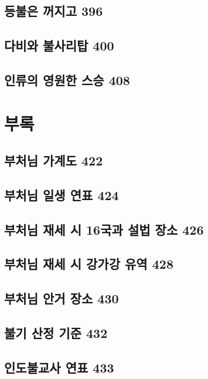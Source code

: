 \documentclass[12pt, a4paper, oneside]{book}
\let\stdsection\section
\renewcommand\section{\newpage\stdsection}
\begin{document}
	\section{등불은 꺼지고 396 }

	\section{다비와 불사리탑 400 }

	\section{인류의 영원한 스승 408}


	\chapter{부록}
	\noptcrule
	\parttoc				


	\section{부처님 가계도 422}


	\section{부처님 일생 연표 424 }

	\section{부처님 재세 시 16국과 설법 장소 426}


	\section{부처님 재세 시 강가강 유역 428 }

	\section{부처님 안거 장소 430 }

	\section{불기 산정 기준 432 }

	\section{인도불교사 연표 433 }
\end{document}
